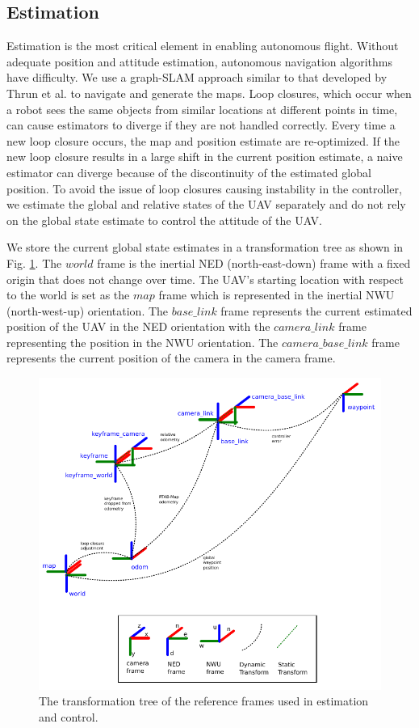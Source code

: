 \documentclass[letterpaper, 10 pt, conference]{ieeeconf}  %
\begin{document}
\subsection{Estimation}

Estimation is the most critical element in enabling autonomous flight. Without adequate position and attitude estimation, autonomous navigation algorithms have difficulty. We use a graph-SLAM approach similar to that developed by Thrun et al. \cite{Thrun2006} to navigate and generate the maps. Loop closures, which occur when a robot sees the same objects from similar locations at different points in time, can cause estimators to diverge if they are not handled correctly. Every time a new loop closure occurs, the map and position estimate are re-optimized. If the new loop closure results in a large shift in the current position estimate, a naive estimator can diverge because of the discontinuity of the estimated global position. To avoid the issue of loop closures causing instability in the controller, we estimate the global and relative states of the UAV separately and do not rely on the global state estimate to control the attitude of the UAV.

We store the current global state estimates in a transformation tree as shown in Fig. \ref{fig:tf_tree}. The $\mathit{world}$ frame is the inertial NED (north-east-down) frame with a fixed origin that does not change over time. The UAV's starting location with respect to the world is set as the $\mathit{map}$ frame which is represented in the inertial NWU (north-west-up) orientation. The $\mathit{base\_link}$ frame represents the current estimated position of the UAV in the NED orientation with the $\mathit{camera\_link}$ frame representing the position in the NWU orientation. The $\mathit{camera\_base\_link}$ frame represents the current position of the camera in the camera frame.

\begin{figure}
\centering
\includegraphics[width=0.9\linewidth]{tf_tree_relative_rtab}
\caption{The transformation tree of the reference frames used in estimation and control.}
\label{fig:tf_tree}
\end{figure}
\end{document}
